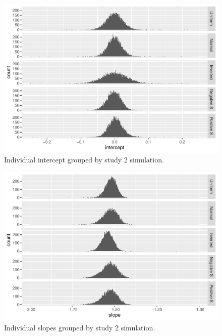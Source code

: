 \documentclass[
  man]{apa6}
\begin{document}
\begin{figure}
\centering
\includegraphics{ICC_project_files/figure-latex/stackedplotIntercept-1.pdf}
\caption{\label{fig:stackedplotIntercept}Individual intercept grouped by study 2 simulation.}
\end{figure}

\begin{figure}
\centering
\includegraphics{ICC_project_files/figure-latex/stackeplotSlope-1.pdf}
\caption{\label{fig:stackeplotSlope}Individual slopes grouped by study 2 simulation.}
\end{figure}
\end{document}
